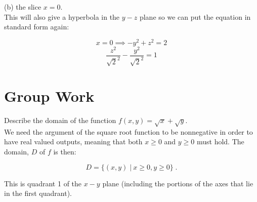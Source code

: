 \documentclass[11pt]{article}
\begin{document}
(b) the slice $x = 0$. \\

This will also give a hyperbola in the $y-z$ plane so we can put the equation in standard form again:

$$ x = 0 \implies -y^2 + z^2 = 2$$
$$\frac{z^2}{\sqrt{2}^2} - \frac{y^2}{\sqrt{2}^2} = 1$$
\newpage


\section*{Group Work}

Describe the domain of the function $f(x,y) = \sqrt{x} + \sqrt{y}$.\\

We need the argument of the square root function to be nonnegative in order to have real valued outputs, meaning that both $x\geq 0$ and $y \geq 0$ must hold. The domain, $D$ of $f$ is then:

$$D = \{(x,y) \; | \: x\geq 0, y\geq 0\} \; .$$

This is quadrant 1 of the $x-y$ plane (including the portions of the axes that lie in the first quadrant). 
\end{document}

